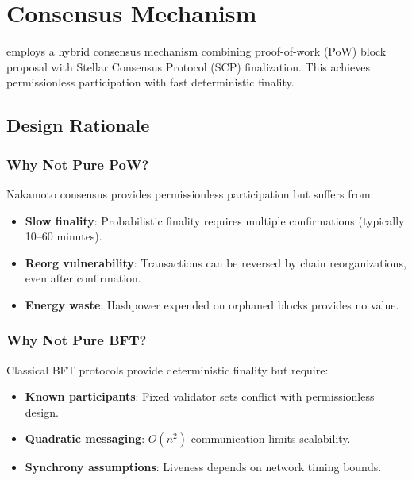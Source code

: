 
\section{Consensus Mechanism}
\label{sec:consensus}

\Botho employs a hybrid consensus mechanism combining proof-of-work (PoW)
block proposal with Stellar Consensus Protocol (SCP) finalization. This
achieves permissionless participation with fast deterministic finality.

\subsection{Design Rationale}

\subsubsection{Why Not Pure PoW?}

Nakamoto consensus provides permissionless participation but suffers from:
\begin{itemize}
  \item \textbf{Slow finality}: Probabilistic finality requires multiple
    confirmations (typically 10--60 minutes).
  \item \textbf{Reorg vulnerability}: Transactions can be reversed by chain
    reorganizations, even after confirmation.
  \item \textbf{Energy waste}: Hashpower expended on orphaned blocks provides
    no value.
\end{itemize}

\subsubsection{Why Not Pure BFT?}

Classical BFT protocols provide deterministic finality but require:
\begin{itemize}
  \item \textbf{Known participants}: Fixed validator sets conflict with
    permissionless design.
  \item \textbf{Quadratic messaging}: $O(n^2)$ communication limits
    scalability.
  \item \textbf{Synchrony assumptions}: Liveness depends on network timing
    bounds.
\end{itemize}

